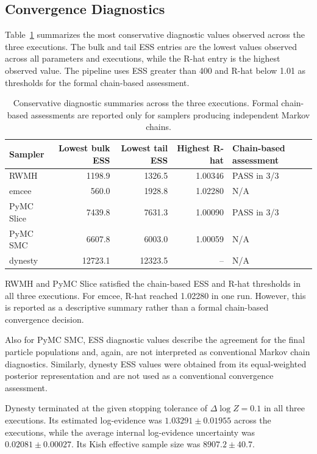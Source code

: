 \subsection{Convergence Diagnostics}

Table~\ref{tab:convergence-results} summarizes the most conservative diagnostic values observed across the three executions. The bulk and tail ESS entries are the lowest values observed across all parameters and executions, while the R-hat entry is the highest observed value. The pipeline uses ESS greater than 400 and R-hat below 1.01 as thresholds for the formal chain-based assessment.

\begin{table}[htbp]
\centering
\small
\caption{Conservative diagnostic summaries across the three executions. Formal chain-based assessments are reported only for samplers producing independent Markov chains.}
\label{tab:convergence-results}
\begin{tabular}{@{}lrrrl@{}}
\toprule
Sampler
  & Lowest bulk ESS
  & Lowest tail ESS
  & Highest R-hat
  & Chain-based assessment \\
\midrule
RWMH       & 1198.9  & 1326.5  & 1.00346 & PASS in 3/3 \\
emcee      & 560.0   & 1928.8  & 1.02280 & N/A \\
PyMC Slice & 7439.8  & 7631.3  & 1.00090 & PASS in 3/3 \\
PyMC SMC   & 6607.8  & 6003.0  & 1.00059 & N/A \\
dynesty    & 12723.1 & 12323.5 & --      & N/A \\
\bottomrule
\end{tabular}
\end{table}

RWMH and PyMC Slice satisfied the chain-based ESS and R-hat thresholds in all three executions. For emcee, R-hat reached 1.02280 in one run. However, this is reported as a descriptive summary rather than a formal chain-based convergence decision.

Also for PyMC SMC, ESS diagnostic values describe the agreement for the final particle populations and, again, are not interpreted as conventional Markov chain diagnostics. Similarly, dynesty ESS values were obtained from its equal-weighted posterior representation and are not used as a conventional convergence assessment.

Dynesty terminated at the given stopping tolerance of $\Delta\log Z=0.1$ in all three executions. Its estimated log-evidence was $1.03291 \pm 0.01955$ across the executions, while the average internal log-evidence uncertainty was $0.02081 \pm 0.00027$. Its Kish effective sample size was $8907.2 \pm 40.7$.


